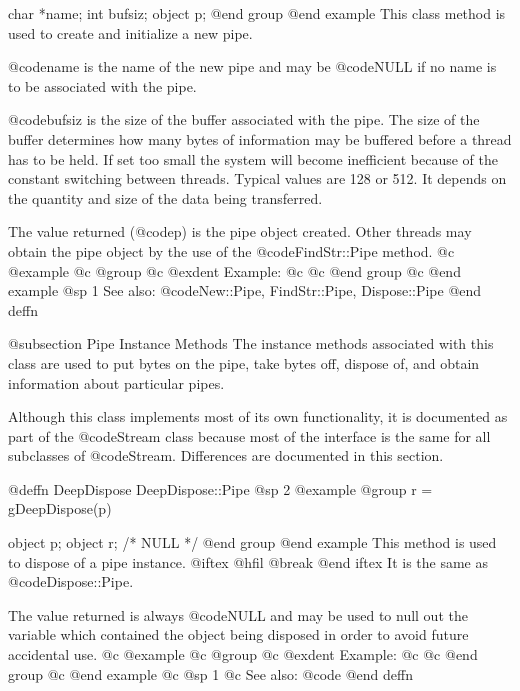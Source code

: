 char    *name;
int     bufsiz;
object  p;
@end group
@end example
This class method is used to create and initialize a new pipe.

@code{name} is the name of the new pipe and may be @code{NULL} if
no name is to be associated with the pipe.

@code{bufsiz} is the size of the buffer associated with the pipe.  The
size of the buffer determines how many bytes of information may be
buffered before a thread has to be held.  If set too small the system will
become inefficient because of the constant switching between threads.
Typical values are 128 or 512.  It depends on the quantity and size of
the data being transferred.

The value returned (@code{p}) is the pipe object created.  Other
threads may obtain the pipe object by the use of the @code{FindStr::Pipe}
method.  
@c @example
@c @group
@c @exdent Example:
@c 
@c @end group
@c @end example
@sp 1
See also:  @code{New::Pipe, FindStr::Pipe, Dispose::Pipe}
@end deffn



















@subsection Pipe Instance Methods
The instance methods associated with this class are used to put bytes
on the pipe, take bytes off, dispose of, and obtain information
about particular pipes.

Although this class implements most of its own functionality, it is
documented as part of the @code{Stream} class because most of the
interface is the same for all subclasses of @code{Stream}.  Differences
are documented in this section.













@deffn {DeepDispose} DeepDispose::Pipe
@sp 2
@example
@group
r = gDeepDispose(p)

object  p;
object  r;     /*  NULL  */
@end group
@end example
This method is used to dispose of a pipe instance.  
@iftex
@hfil @break 
@end iftex
It is the same as @code{Dispose::Pipe}.

The value returned is always @code{NULL} and may be used to null out
the variable which contained the object being disposed in order to
avoid future accidental use.
@c @example
@c @group
@c @exdent Example:
@c 
@c @end group
@c @end example
@c @sp 1
@c See also:  @code{}
@end deffn








